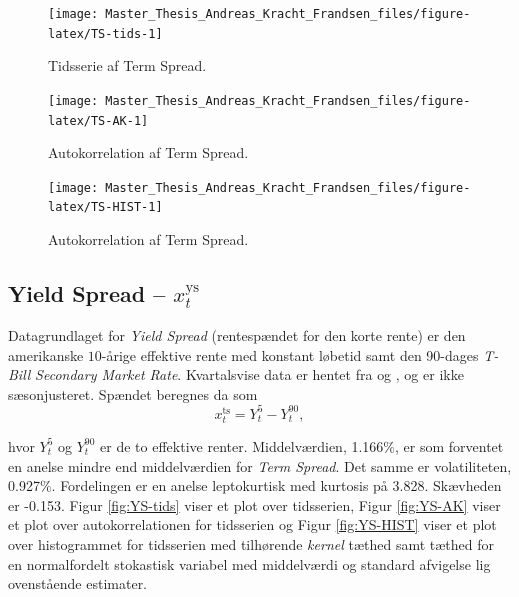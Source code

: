 \documentclass[
  a4paper,
  oneside]{memoir}
\begin{document}
\begin{figure}[htbp!]

{\centering \texttt{[image: Master\_Thesis\_Andreas\_Kracht\_Frandsen\_files/figure-latex/TS-tids-1]} 

}

\caption{Tidsserie af Term Spread.}\label{fig:TS-tids}
\end{figure}

\begin{figure}[htbp!]

{\centering \texttt{[image: Master\_Thesis\_Andreas\_Kracht\_Frandsen\_files/figure-latex/TS-AK-1]} 

}

\caption{Autokorrelation af Term Spread.}\label{fig:TS-AK}
\end{figure}

\begin{figure}[htbp!]

{\centering \texttt{[image: Master\_Thesis\_Andreas\_Kracht\_Frandsen\_files/figure-latex/TS-HIST-1]} 

}

\caption{Autokorrelation af Term Spread.}\label{fig:TS-HIST}
\end{figure}

\hypertarget{yield-spread-x_ttextys}{%
\subsection{\texorpdfstring{Yield Spread -- \(x_t^{\text{ys}}\)}{Yield Spread -- x\_t\^{}\{\textbackslash text\{ys\}\}}}\label{yield-spread-x_ttextys}}

Datagrundlaget for \emph{Yield Spread} (rentespændet for den korte rente) er den amerikanske \(10\)-årige effektive rente med konstant løbetid samt den 90-dages \emph{T-Bill} \emph{Secondary Market Rate}. Kvartalsvise data er hentet fra \citep{FRED52020} og \citep{FRED902020}, og er ikke sæsonjusteret. Spændet beregnes da som
\[x_t^{\text{ts}}=Y_t^{5}-Y_t^{90},\]

hvor \(Y_t^{5}\) og \(Y_t^{90}\) er de to effektive renter. Middelværdien, 1.166\(\%\), er som forventet en anelse mindre end middelværdien for \emph{Term Spread}. Det samme er volatiliteten, 0.927\(\%\). Fordelingen er en anelse leptokurtisk med kurtosis på 3.828. Skævheden er -0.153. Figur \ref{fig:YS-tids} viser et plot over tidsserien, Figur \ref{fig:YS-AK} viser et plot over autokorrelationen for tidsserien og Figur \ref{fig:YS-HIST} viser et plot over histogrammet for tidsserien med tilhørende \emph{kernel} tæthed samt tæthed for en normalfordelt stokastisk variabel med middelværdi og standard afvigelse lig ovenstående estimater.
\end{document}
